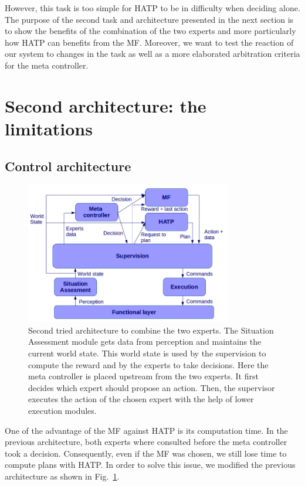 \documentclass[english,a4paper,11pt,twoside]{StyleThese}
\begin{document}
However, this task is too simple for HATP to be in difficulty when deciding alone. The purpose of the second task and architecture presented in the next section is to show the benefits of the combination of the two experts and more particularly how HATP can benefits from the MF. Moreover, we want to test the reaction of our system to changes in the task as well as a more elaborated arbitration criteria for the meta controller.


\section{Second architecture: the limitations}

\subsection{Control architecture}

\begin{figure}[!h]
	\centering
    \includegraphics[width=0.8\textwidth]{figs/Chapter7/SecondArchi.png}
    \caption{Second tried architecture to combine the two experts. The Situation Assessment module gets data from perception and maintains the current world state. This world state is used by the supervision to compute the reward and by the experts to take decisions. Here the meta controller is placed upstream from the two experts. It first decides which expert should propose an action. Then, the supervisor executes the action of the chosen expert with the help of lower execution modules.}
    \label{fig:SecondArchi}
\end{figure}

One of the advantage of the MF against HATP is its computation time. In the previous architecture, both experts where consulted before the meta controller took a decision. Consequently, even if the MF was chosen, we still lose time to compute plans with HATP. In order to solve this issue, we modified the previous architecture as shown in Fig.~\ref{fig:SecondArchi}. 
\end{document}
